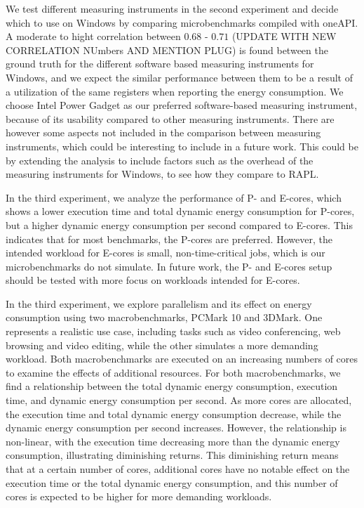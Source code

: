 
We test different measuring instruments in the second experiment and decide which to use on Windows by comparing microbenchmarks compiled with oneAPI. A moderate to hight correlation between $0.68$ - $0.71$ (UPDATE WITH NEW CORRELATION NUmbers AND MENTION PLUG) is found between the ground truth for the different software based measuring instruments for Windows, and we expect the similar performance between them to be a result of a utilization of the same registers when reporting the energy consumption. We choose Intel Power Gadget as our preferred software-based measuring instrument, because of its usability compared to other measuring instruments. There are however some aspects not included in the comparison between measuring instruments, which could be interesting to include in a future work. This could be by extending the analysis to include factors such as the overhead of the measuring instruments for Windows, to see how they compare to RAPL.

In the third experiment, we analyze the performance of P- and E-cores, which shows a lower execution time and total dynamic energy consumption for P-cores, but a higher dynamic energy consumption per second compared to E-cores. This indicates that for most benchmarks, the P-cores are preferred. However, the intended workload for E-cores is small, non-time-critical jobs, which is our microbenchmarks do not simulate. In future work, the P- and E-cores setup should be tested with more focus on workloads intended for E-cores.

In the third experiment, we explore parallelism and its effect on energy consumption using two macrobenchmarks, PCMark 10 and 3DMark. One represents a realistic use case, including tasks such as video conferencing, web browsing and video editing, while the other simulates a more demanding workload. Both macrobenchmarks are executed on an increasing numbers of cores to examine the effects of additional resources. For both macrobenchmarks, we find a relationship between the total dynamic energy consumption, execution time, and dynamic energy consumption per second. As more cores are allocated, the execution time and total dynamic energy consumption decrease, while the dynamic energy consumption per second increases. However, the relationship is non-linear, with the execution time decreasing more than the dynamic energy consumption, illustrating diminishing returns. This diminishing return means that at a certain number of cores, additional cores have no notable effect on the execution time or the total dynamic energy consumption, and this number of cores is expected to be higher for more demanding workloads.
